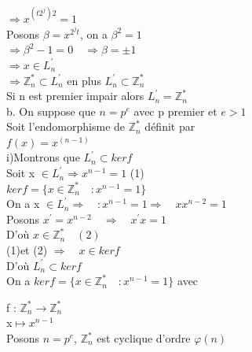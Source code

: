 \documentclass[10pt]{beamer}
\begin{document}
\begin{frame}

$\Longrightarrow   x^{(t2^{j})2}=1$\\
Posons $\beta = x^{2^{j}t}$, on a $\beta^2 =1$\\
$\Longrightarrow \beta^2-1=0 \quad \Longrightarrow \beta = \pm 1$\\
$\Longrightarrow x \in L^{'}_n$\\
$\Longrightarrow \mathbb{Z}_n^* \subset L^{'}_n$ en plus $L^{'}_n \subset \mathbb{Z}_n^*$\\

Si n est premier impair alors $ L^{'}_n = \mathbb{Z}_n^*$\\

b. On suppose que $n=p^e$ avec p premier et $e>1$\\

Soit l'endomorphisme de $ \mathbb{Z}_n^*$  d\'efinit par \\

$f(x)= x^(n-1)$\\

i)Montrons que $L^{'}_n \subset kerf $\\

Soit  x $ \in L^{'}_n \Longrightarrow x^{n-1}=1$ \quad (1)\\
 $ kerf = \{ x \in \mathbb{Z}_n^{*} \quad : x^{n-1}=1\}$\\
 On a x $ \in L^{'}_n \Longrightarrow\quad : x^{n-1}=1\Longrightarrow\quad xx^{n-2}=1$\\
 Posons $x^{'}=x^{n-2}\quad \Longrightarrow\quad x^{'}x=1$\\
 D'o\`u $x \in \mathbb{Z}_n^{*} \quad (2)$\\
 
 (1)et (2) $\Longrightarrow \quad x\in kerf$ \\
 
 D'o\`u $L^{'}_n \subset kerf $\\
 
On a $ kerf = \{ x \in \mathbb{Z}_n^{*} \quad : x^{n-1}=1\}$  avec

 f : $ \mathbb{Z}_n^{*} \longrightarrow \mathbb{Z}_n^{*}$\\

 x$\longmapsto x^{n-1}$\\
 Posons $n= p^e$, $ \mathbb{Z}_n^{*}$ est cyclique d'ordre $\varphi(n)$\\


\end{frame}
\end{document}
